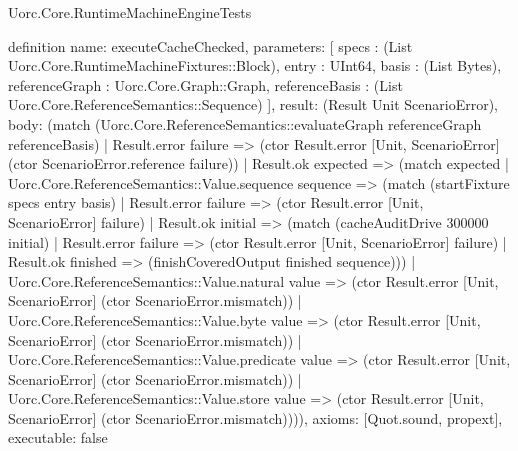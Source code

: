 \begin{lexlean}{Uorc.Core.RuntimeMachineEngineTests}
\begin{semanticmodule}
definition{
  name: executeCacheChecked,
  parameters: [
    specs : (List Uorc.Core.RuntimeMachineFixtures::Block),
    entry : UInt64,
    basis : (List Bytes),
    referenceGraph : Uorc.Core.Graph::Graph,
    referenceBasis : (List Uorc.Core.ReferenceSemantics::Sequence)
  ],
  result: (Result Unit ScenarioError),
  body: (match (Uorc.Core.ReferenceSemantics::evaluateGraph referenceGraph referenceBasis)
    | Result.error failure => (ctor Result.error [Unit, ScenarioError] (ctor ScenarioError.reference failure))
    | Result.ok expected => (match expected
      | Uorc.Core.ReferenceSemantics::Value.sequence sequence => (match (startFixture specs entry basis)
        | Result.error failure => (ctor Result.error [Unit, ScenarioError] failure)
        | Result.ok initial => (match (cacheAuditDrive 300000 initial)
          | Result.error failure => (ctor Result.error [Unit, ScenarioError] failure)
          | Result.ok finished => (finishCoveredOutput finished sequence)))
      | Uorc.Core.ReferenceSemantics::Value.natural value => (ctor Result.error [Unit, ScenarioError] (ctor ScenarioError.mismatch))
      | Uorc.Core.ReferenceSemantics::Value.byte value => (ctor Result.error [Unit, ScenarioError] (ctor ScenarioError.mismatch))
      | Uorc.Core.ReferenceSemantics::Value.predicate value => (ctor Result.error [Unit, ScenarioError] (ctor ScenarioError.mismatch))
      | Uorc.Core.ReferenceSemantics::Value.store value => (ctor Result.error [Unit, ScenarioError] (ctor ScenarioError.mismatch)))),
  axioms: [Quot.sound, propext],
  executable: false
}


\end{semanticmodule}
\end{lexlean}
